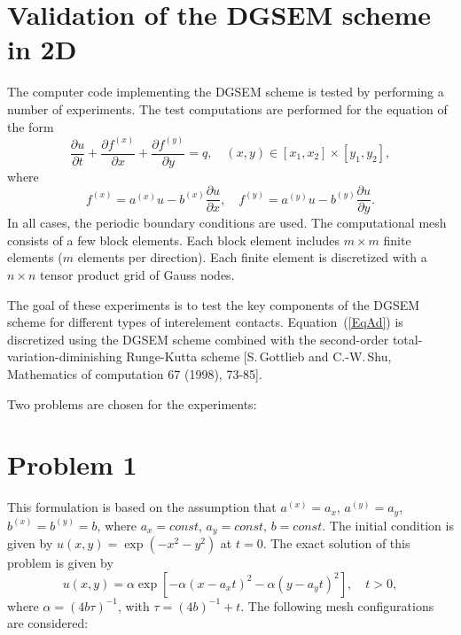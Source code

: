 \documentclass[fleqn]{article}
\begin{document}
\section*{Validation of the DGSEM scheme in 2D}
The computer code implementing the DGSEM scheme is tested by performing a number of experiments. The test computations are performed for the equation of the form
\begin{equation}
\label{EqAd}
\frac{\partial u}{\partial t}+\frac{\partial f^{(x)}}{\partial x}+\frac{\partial f^{(y)}}{\partial y}=q, \quad (x,y) \in [x_{1},x_{2}] \times [y_{1},y_{2}],
\end{equation}
where
\begin{equation}
f^{(x)}=a^{(x)}u-b^{(x)}\frac{\partial u}{\partial x}, \quad
f^{(y)}=a^{(y)}u-b^{(y)}\frac{\partial u}{\partial y}.
\end{equation}
In all cases, the periodic boundary conditions are used. The computational mesh consists of a few block elements. Each block element includes $m \times m$ finite elements ($m$ elements per direction). Each finite element is discretized with a $n \times n$ tensor product grid of Gauss nodes.

The goal of these experiments is to test the key components of the DGSEM scheme for different types of interelement contacts. Equation~(\ref{EqAd}) is discretized using the DGSEM scheme combined with the second-order total-variation-diminishing Runge-Kutta scheme [S.\,Gottlieb and C.-W.\,Shu, Mathematics of computation 67 (1998), 73-85].

Two problems are chosen for the experiments:
\section{Problem 1}
This formulation is based on the assumption that $a^{(x)} = a_{x}$, $a^{(y)}=a_{y}$, $b^{(x)}=b^{(y)}=b$, where $a_{x}=const$, $a_{y}=const$, $b=const$.  The initial condition is given by $u(x,y)=\exp (-x^{2}-y^{2} )$ at $t=0$.  The exact solution of this problem is given by
\begin{displaymath}
u(x,y)=\alpha \exp\left[-\alpha \left(x-a_{x}t\right)^{2}-\alpha \left(y-a_{y}t\right)^{2} \right], \quad t>0,
\end{displaymath}
where $\alpha=(4 b \tau)^{-1}$, with $\tau=(4b)^{-1}+t$.  The following mesh configurations are considered: \\
\end{document}
